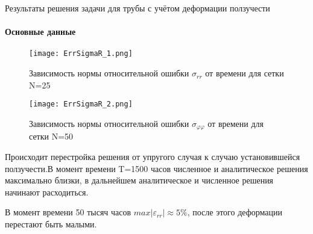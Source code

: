 \documentclass{beamer}
\begin{document}
\begin{frame}{Результаты решения задачи для трубы с учётом деформации ползучести}
\framesubtitle{Основные данные}
\small

\begin{multicols}{2}
\begin{figure}[h]
\centering
\texttt{[image: ErrSigmaR\_1.png]}
\captionsetup{font=tiny}
\caption{Зависимость нормы относительной ошибки $\sigma_{rr}$ от времени для сетки N=25}
\end{figure}
\vspace{-2em}
\begin{figure}
\centering
\texttt{[image: ErrSigmaR\_2.png]}
\captionsetup{font=tiny}
\caption{Зависимость нормы относительной ошибки $\sigma_{\varphi\varphi}$ от времени для сетки N=50}
\end{figure}

\columnbreak

Происходит перестройка решения от упругого случая к случаю установившейся ползучести.В момент времени T=1500 часов численное и аналитическое решения максимально близки, в дальнейшем аналитическое и численное решения начинают расходиться. 
\medskip

В момент времени 50 тысяч часов $max\left|\varepsilon_{rr}\right|\approx 5\%$, после этого деформации перестают быть малыми.

\end{multicols}

\end{frame}
\end{document}
